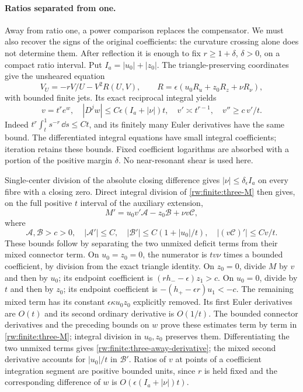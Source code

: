\paragraph{Ratios separated from one.}
Away from ratio one, a power comparison replaces the compensator.
We must also recover the signs of the original coefficients: the
curvature crossing alone does not determine them.
After reflection it is enough to fix $r\ge1+\delta$, $\delta>0$,
on a compact ratio interval. Put $I_a=|u_0|+|z_0|$.
The triangle-preserving coordinates give the unsheared equation
\[
 V_U=-rV/U-V^2R(U,V),\qquad
 R=\epsilon(u_0R_u+z_0R_z+\nu R_\nu),
\]
with bounded finite jets. Its exact reciprocal integral yields
\[
 v=t^re^w,\quad |D^jw|\le C\epsilon(I_a+|\nu|)t,\quad
 v'\asymp t^{r-1},\quad v''\ge c\,v'/t.
\]
Indeed $t^r\int_t^1s^{-r}\,\dd s\le Ct$, and its finitely many
Euler derivatives have the same bound. The differentiated integral
equations have small integral coefficients; iteration retains these
bounds. Fixed coefficient logarithms are absorbed with a portion of
the positive margin $\delta$. No near-resonant shear is used here.

Single-center division of the absolute closing difference gives
$|\nu|\le\delta_\epsilon I_a$ on every fibre with a closing zero.
Direct integral division of \eqref{rw:finite:three-M} then gives,
on the full positive $t$ interval of the auxiliary extension,
\begin{equation}\label{rw:finite:three-away-derivative}
 M'=u_0v'\mathcal A-z_0\mathcal B+\nu v\mathcal C,
\end{equation}
where
\[
 \mathcal A,\mathcal B>c>0,\quad
 |\mathcal A'|\le C,\quad
 |\mathcal B'|\le C(1+|u_0|/t),\quad
 |(v\mathcal C)'|\le Cv/t.
\]
These bounds follow by separating the two unmixed deficit terms
from their mixed connector term. On $u_0=z_0=0$, the numerator is
$tv\nu$ times a bounded coefficient, by division from the exact
triangle identity.
On $z_0=0$, divide $M$ by $v$ and then by $u_0$; its endpoint
coefficient is $(rh_--\epsilon)z_1>c$.
On $u_0=0$, divide by $t$ and then by $z_0$; its endpoint
coefficient is $-(h_+-\epsilon r)u_1<-c$.
The remaining mixed term has its constant
$\epsilon\kappa u_0z_0$ explicitly removed. Its first Euler
derivatives are $O(t)$ and its second ordinary derivative is
$O(1/t)$. The bounded connector derivatives and the preceding
bounds on $w$ prove these estimates term by term in
\eqref{rw:finite:three-M}; integral division in $u_0,z_0$
preserves them. Differentiating the two unmixed terms gives
\eqref{rw:finite:three-away-derivative}; the mixed second derivative
accounts for $|u_0|/t$ in $\mathcal B'$. Ratios of $v$ at points
of a coefficient integration segment are positive bounded units,
since $r$ is held fixed and the corresponding difference of $w$
is $O(\epsilon(I_a+|\nu|)t)$.

